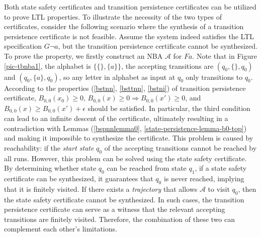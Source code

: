 \documentclass[acmlarge]{acmart}
\begin{document}
Both state safety certificates and transition persistence certificates can be utilized to prove LTL properties. To illustrate the necessity of the two types of certificates, consider the following scenario where the synthesis of a transition persistence certificate is not feasible. Assume the system indeed satisfies the LTL specification $G \lnot a$, but the transition persistence certificate cannot be synthesized. To prove the property, we firstly construct an NBA $\mathcal{A}$ for $F a$. Note that in Figure \ref{pic-tbnba1}, the alphabet is $\{ \{\},\{a\}\}$, the accepting transitions are $(q_0, \{\}, q_0)$ and $(q_0, \{a\}, q_0)$, so any letter in alphabet as input at $q_0$ only transitions to $q_0$. According to the properties (\ref{bstnn}, \ref{bsttnn}, \ref{bstni}) of transition persistence certificate, $B_{0,0}(x_0) \geq 0$, $B_{0,0}(x) \geq 0 \Rightarrow B_{0,0}(x') \geq 0$, and $B_{0,0}(x) \geq B_{0,0}(x') + \epsilon$ should be satisfied. In particular, the third condition can lead to an infinite descent of the certificate, ultimately resulting in a contradiction with Lemmas (\ref{bspnnlemma0}, \ref{state-persistence-lemma-b0-top}) and making it impossible to synthesize the certificate. This problem is caused by reachability: if the \emph{start state} $q_0$ of the accepting transitions cannot be reached by all runs. However, this problem can be solved using the state safety certificate. By determining whether state $q_0$ can be reached from state $q_1$, if a state safety certificate can be synthesized, it guarantees that $q_0$ is never reached, implying that it is finitely visited. If there exists a \emph{trajectory} that allows $\mathcal{A}$ to visit $q_0$, then the state safety certificate cannot be synthesized. In such cases, the transition persistence certificate can serve as a witness that the relevant accepting transitions are finitely visited. Therefore, the combination of these two can complement each other's limitations.

\end{document}
